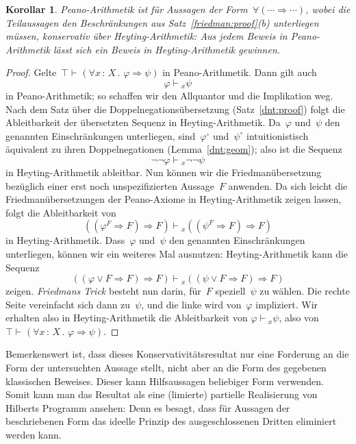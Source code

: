 \documentclass[a4paper,ngerman,12pt]{scrartcl}
\theoremstyle{definition}
\theoremstyle{plain}
\newtheorem{kor}[defn]{Korollar}
\theoremstyle{remark}
\newcommand{\seq}[1]{\mathrel{\vdash\!\!\!_{#1}}}
\renewcommand{\_}{\mathpunct{.}\,}
\newcommand{\?}{\,{:}\,}
\begin{document}
\begin{kor}\label{peanokons}Peano-Arithmetik ist für Aussagen der Form~$\forall (\cdots
\Rightarrow \cdots)$, wobei die Teilaussagen den Beschränkungen
aus Satz~\ref{friedman:proof}(b) unterliegen müssen, \emph{konservativ} über
Heyting-Arithmetik: Aus jedem Beweis in Peano-Arithmetik lässt sich ein Beweis
in Heyting-Arithmetik gewinnen.\end{kor}
\begin{proof}Gelte~$\top \seq{} (\forall x\?X\_ \varphi \Rightarrow \psi)$ in
Peano-Arithmetik. Dann gilt auch
\[ \varphi \seq{x} \psi \]
in Peano-Arithmetik; so schaffen wir den Allquantor und die Implikation weg.
Nach dem Satz über die Doppelnegationsübersetzung (Satz~\ref{dnt:proof}) folgt
die Ableitbarkeit der übersetzten Sequenz in Heyting-Arithmetik. Da~$\varphi$
und~$\psi$ den genannten Einschränkungen unterliegen, sind~$\varphi^\circ$
und~$\psi^\circ$ intuitionistisch äquivalent zu ihren Doppelnegationen
(Lemma~\ref{dnt:geom}); also ist die Sequenz
\[ \neg\neg\varphi \seq{x} \neg\neg\psi \]
in Heyting-Arithmetik ableitbar. Nun können wir die Friedmanübersetzung
bezüglich einer erst noch unspezifizierten Aussage~$F$ anwenden. Da sich leicht die
Friedmanübersetzungen der Peano-Axiome in Heyting-Arithmetik zeigen lassen,
folgt die Ableitbarkeit von
\[ ((\varphi^F \Rightarrow F) \Rightarrow F) \seq{x}
  ((\psi^F \Rightarrow F) \Rightarrow F) \]
in Heyting-Arithmetik. Dass~$\varphi$ und~$\psi$ den genannten Einschränkungen
unterliegen, können wir ein weiteres Mal ausnutzen: Heyting-Arithmetik kann die
Sequenz
\[ ((\varphi \vee F \Rightarrow F) \Rightarrow F) \seq{x}
  ((\psi \vee F \Rightarrow F) \Rightarrow F) \]
zeigen. \emph{Friedmans Trick} besteht nun darin, für~$F$ speziell~$\psi$ zu
wählen. Die rechte Seite vereinfacht sich dann zu~$\psi$, und die linke wird
von~$\varphi$ impliziert.
Wir erhalten also in Heyting-Arithmetik die Ableitbarkeit
von $\varphi \seq{x} \psi$, also von
$\top \seq{} (\forall x\?X\_ \varphi \Rightarrow \psi)$.
\end{proof}

Bemerkenswert ist, dass dieses Konservativitätsresultat nur eine Forderung
an die Form der untersuchten Aussage stellt, nicht aber an die Form des gegebenen
klassischen Beweises. Dieser kann Hilfsaussagen beliebiger Form verwenden.
Somit kann man das Resultat als eine (limierte) partielle Realisierung
von Hilberts Programm ansehen: Denn es besagt, dass für Aussagen der
beschriebenen Form das ideelle Prinzip des ausgeschlossenen Dritten eliminiert
werden kann.
\end{document}
